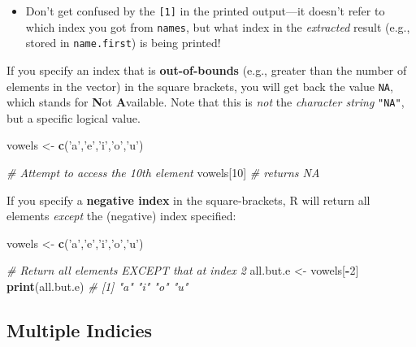 \documentclass[]{book}
\newenvironment{Shaded}{\begin{snugshade}}{\end{snugshade}}
\newcommand{\KeywordTok}[1]{\textcolor[rgb]{0.13,0.29,0.53}{\textbf{#1}}}
\newcommand{\DecValTok}[1]{\textcolor[rgb]{0.00,0.00,0.81}{#1}}
\newcommand{\StringTok}[1]{\textcolor[rgb]{0.31,0.60,0.02}{#1}}
\newcommand{\CommentTok}[1]{\textcolor[rgb]{0.56,0.35,0.01}{\textit{#1}}}
\newcommand{\OperatorTok}[1]{\textcolor[rgb]{0.81,0.36,0.00}{\textbf{#1}}}
\newcommand{\NormalTok}[1]{#1}
\providecommand{\tightlist}{%
  \setlength{\itemsep}{0pt}\setlength{\parskip}{0pt}}
\theoremstyle{definition}
\theoremstyle{definition}
\theoremstyle{remark}
\begin{document}
\begin{itemize}
\tightlist
\item
  Don't get confused by the \texttt{{[}1{]}} in the printed output---it
  doesn't refer to which index you got from \texttt{names}, but what
  index in the \emph{extracted} result (e.g., stored in
  \texttt{name.first}) is being printed!
\end{itemize}

If you specify an index that is \textbf{out-of-bounds} (e.g., greater
than the number of elements in the vector) in the square brackets, you
will get back the value \texttt{NA}, which stands for \textbf{N}ot
\textbf{A}vailable. Note that this is \emph{not} the \emph{character
string} \texttt{"NA"}, but a specific logical value.

\begin{Shaded}
\begin{Highlighting}[]
\NormalTok{vowels <-}\StringTok{ }\KeywordTok{c}\NormalTok{(}\StringTok{'a'}\NormalTok{,}\StringTok{'e'}\NormalTok{,}\StringTok{'i'}\NormalTok{,}\StringTok{'o'}\NormalTok{,}\StringTok{'u'}\NormalTok{)}

\CommentTok{# Attempt to access the 10th element}
\NormalTok{vowels[}\DecValTok{10}\NormalTok{]  }\CommentTok{# returns NA}
\end{Highlighting}
\end{Shaded}

If you specify a \textbf{negative index} in the square-brackets, R will
return all elements \emph{except} the (negative) index specified:

\begin{Shaded}
\begin{Highlighting}[]
\NormalTok{vowels <-}\StringTok{ }\KeywordTok{c}\NormalTok{(}\StringTok{'a'}\NormalTok{,}\StringTok{'e'}\NormalTok{,}\StringTok{'i'}\NormalTok{,}\StringTok{'o'}\NormalTok{,}\StringTok{'u'}\NormalTok{)}

\CommentTok{# Return all elements EXCEPT that at index 2}
\NormalTok{all.but.e <-}\StringTok{ }\NormalTok{vowels[}\OperatorTok{-}\DecValTok{2}\NormalTok{]}
\KeywordTok{print}\NormalTok{(all.but.e)  }\CommentTok{# [1] "a" "i" "o" "u"}
\end{Highlighting}
\end{Shaded}

\subsection{Multiple Indicies}\label{multiple-indicies}
\end{document}
